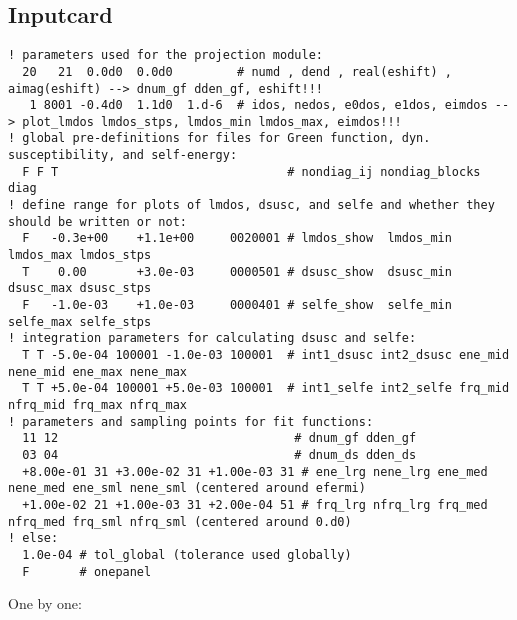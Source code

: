 \documentclass[11pt,fleqn]{book} %
\begin{document}
\subsection{Inputcard}
\begin{VBox}
{
\footnotesize
\begin{verbatim}
! parameters used for the projection module:
  20   21  0.0d0  0.0d0         # numd , dend , real(eshift) , aimag(eshift) --> dnum_gf dden_gf, eshift!!!
   1 8001 -0.4d0  1.1d0  1.d-6  # idos, nedos, e0dos, e1dos, eimdos --> plot_lmdos lmdos_stps, lmdos_min lmdos_max, eimdos!!!
! global pre-definitions for files for Green function, dyn. susceptibility, and self-energy:
  F F T                                # nondiag_ij nondiag_blocks diag
! define range for plots of lmdos, dsusc, and selfe and whether they should be written or not:
  F   -0.3e+00    +1.1e+00     0020001 # lmdos_show  lmdos_min lmdos_max lmdos_stps
  T    0.00       +3.0e-03     0000501 # dsusc_show  dsusc_min dsusc_max dsusc_stps
  F   -1.0e-03    +1.0e-03     0000401 # selfe_show  selfe_min selfe_max selfe_stps
! integration parameters for calculating dsusc and selfe:
  T T -5.0e-04 100001 -1.0e-03 100001  # int1_dsusc int2_dsusc ene_mid nene_mid ene_max nene_max
  T T +5.0e-04 100001 +5.0e-03 100001  # int1_selfe int2_selfe frq_mid nfrq_mid frq_max nfrq_max
! parameters and sampling points for fit functions:
  11 12                                 # dnum_gf dden_gf
  03 04                                 # dnum_ds dden_ds
  +8.00e-01 31 +3.00e-02 31 +1.00e-03 31 # ene_lrg nene_lrg ene_med nene_med ene_sml nene_sml (centered around efermi)
  +1.00e-02 21 +1.00e-03 31 +2.00e-04 51 # frq_lrg nfrq_lrg frq_med nfrq_med frq_sml nfrq_sml (centered around 0.d0)
! else:
  1.0e-04 # tol_global (tolerance used globally)
  F       # onepanel
\end{verbatim}
}
\end{VBox}
One by one:
\end{document}
